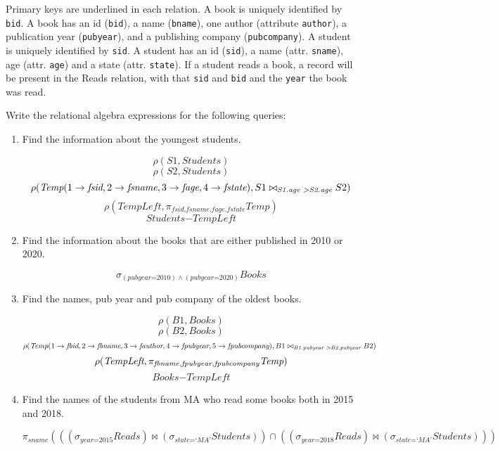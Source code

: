\documentclass[letterpaper, 11pt]{article}
\begin{document}
Primary keys are underlined  in each relation. A book is uniquely identified by \texttt{bid}. A book has an id (\texttt{bid}), a name (\texttt{bname}), one author (attribute \texttt{author}), a publication year (\texttt{pubyear}), and a publishing company (\texttt{pubcompany}). A student is uniquely identified by \texttt{sid}. A student has an id (\texttt{sid}), a name (attr. \texttt{sname}), age (attr. \texttt{age}) and a state (attr. \texttt{state}). If a student reads a book, a record will be present in the Reads relation, with that \texttt{sid} and \texttt{bid} and the \texttt{year} the book was read.

Write the relational algebra expressions for the following queries:
\begin{enumerate}[label={\alph*}),leftmargin=*]
    \item Find the information about the youngest students.
    \begin{tcolorbox}
    \[\rho(S1, \textit{Students})\]
    \[\rho(S2, \textit{Students})\]
    \[\rho(\textit{Temp}(1 \to \textit{fsid}, 2 \to \textit{fsname}, 3 \to \textit{fage}, 4 \to \textit{fstate}), S1 \bowtie_{\textit{S1.age \textgreater S2.age}}S2)\]
    \[\rho(\textit{TempLeft}, \pi_{\textit{fsid,fsname,fage,fstate}}\textit{Temp})\]
    \[\textit{Students} - \textit{TempLeft}\]
    \end{tcolorbox}
    \item Find the information about the books that are either published in 2010 or 2020.
    \begin{tcolorbox}
    \[\sigma_{(\textit{pubyear=2010}) \wedge (\textit{pubyear=2020})}\textit{Books}\]    
    \end{tcolorbox}
    \item Find the names, pub year and pub company of the oldest books.
    \begin{tcolorbox}
    \[\rho(B1, \textit{Books})\]
    \[\rho(B2, \textit{Books})\]
    \[\rho(\textit{Temp}(1 \to \textit{fbid}, 2 \to \textit{fbname}, 3 \to \textit{fauthor}, 4 \to \textit{fpubyear}, 5 \to \textit{fpubcompany}), B1 \bowtie_{\textit{B1.pubyear \textgreater B2.pubyear}} B2)\]
    \[\rho(\textit{TempLeft}, \pi_{\textit{fbname,fpubye\textit{}ar,fpubcompany}}\textit{Temp})\]
    \[\textit{Books} - \textit{TempLeft}\]
    \end{tcolorbox}
    \item Find the names of the students from MA who read some books both in 2015 and 2018.
    \begin{tcolorbox}
    \[\pi_{\textit{sname}}(((\sigma_{\textit{year=2015}}\textit{Reads}) \bowtie (\sigma_{\textit{state=`MA'}}\textit{Students})) \cap ((\sigma_{\textit{year=2018}}\textit{Reads}) \bowtie (\sigma_{\textit{state=`MA'}}\textit{Students})))\]

\end{tcolorbox}
\end{enumerate}
\end{document}
